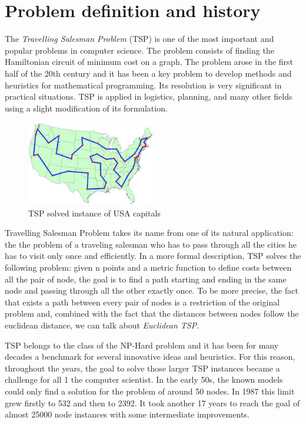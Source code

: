 \section{Problem definition and history}
The \emph{Travelling Salesman Problem} (TSP) is one of the most important and popular
problems in computer science. The problem consists of finding the Hamiltonian
circuit of minimum cost on a graph. The problem arose in the first half of the
20th century and it has been a key problem to develop methods and heuristics
for mathematical programming. Its resolution is very significant in practical
situations. TSP is applied in logistics, planning, and many other fields using
a slight modification of its formulation.

\begin{figure}[H] 
    \centering
    \includegraphics[width= 0.5\textwidth]{figures/tspexample.jpg} 
    \caption[TSP solved instance of USA capitals]{TSP solved instance of USA capitals}
    \label{fig:flow around cylinder} 
\end{figure} 

Travelling Salesman Problem takes its name from one of its natural application: the
the problem of a traveling salesman who has to pass through all the cities he has to
visit only once and efficiently. In a more formal description, TSP solves the following
problem: given n points and a metric function to define costs between all the pair
of node, the goal is to find a path starting and ending in the same node and passing
through all the other exactly once. To be more precise, the fact that exists a path
between every pair of nodes is a restriction of the original problem and, combined
with the fact that the distances between nodes follow the euclidean distance, we
can talk about \emph{Euclidean TSP}.

TSP belongs to the class of the NP-Hard problem and it has been for many decades
a benchmark for several innovative ideas and heuristics. For this reason,
throughout the years, the goal to solve those larger TSP instances became a
challenge for all 1 the computer scientist. In the early 50s, the known models
could only find a solution for the problem of around 50
nodes\citep{dantzig1954solution}. In 1987 this limit grew firstly to 532 and
then to 2392. It took another 17 years to reach the goal of almost 25000 node
instances with some intermediate improvements.

